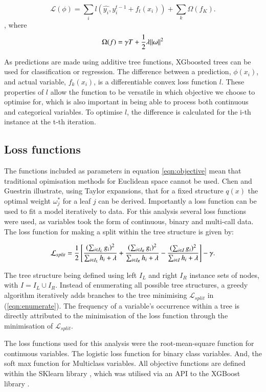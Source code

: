 \documentclass[review,12pt,authoryear]{elsarticle}
\begin{document}
\begin{linenumbers}
\begin{equation}\label{eqn:objective}
 \mathcal{L}(\phi)=\sum_i l(\hat{y_i}, y_i^{t-1} + f_t(x_i)) + \sum_k \Omega (f_K).
\end{equation}, where
\begin{equation}
  \Omega(f) = \gamma T + {{1}\over{2}}\lambda ||\omega||^2
\end{equation}

As predictions are made using additive tree functions, XGboosted trees can be used for classification or regression. The difference between a prediction, $\phi(x_i)$, and actual variable, $f_{k}(x_i)$, is a differentiable convex loss function $l$. These properties of $l$ allow the function to be versatile in which objective we choose to optimise for, which is also important in being able to process both continuous and categorical variables. To optimise $l$, the difference is calculated for the i-th instance at the t-th iteration.
\subsection{Loss functions}

The functions included as parameters in equation \ref{eqn:objective} mean that traditional opimisation methods for Euclidean space cannot be used. Chen and Guestrin \citep{chenXGBoostScalableTree2016} illustrate, using Taylor expansions, that for a fixed structure $q(x)$ the optimal weight $\omega^*_j$ for a leaf $j$ can be derived. Importantly a loss function can be used to fit a model iteratively to data. For this analysis several loss functions were used, as variables took the form of continuous, binary and multi-call data. The loss function for making a split within the tree structure is given by:

\begin{equation} \label{eqn:enumerate}
\mathcal{L}_{split} = {{1}\over{2}} \left[ 
 {{(\sum_{i\in I_L}g_i)^{2}}\over{\sum_{i\in I_L} h_i + \lambda}} +
 {{(\sum_{i\in I_R}g_i)^{2}}\over{\sum_{i\in I_R} h_i + \lambda}} -
 {{(\sum_{i\in I}{g_i})^{2}}\over{\sum_{i \in I} h_i + \lambda}} \right] - \gamma.
\end{equation}

The tree structure being defined using left $I_L$ and right $I_R$ instance sets of nodes, with $I = I_L \cup I_R$. Instead of enumerating all possible tree structures, a greedy algorithm iteratively adds branches to the tree minimising $ \mathcal{L}_{split} $ in (\ref{eqn:enumerate}). The frequency of a variable's occurrence within a tree is directly attributed to the minimisation of the loss function through the minimisation of $ \mathcal{L}_{split} $.
\par
The loss functions used for this analysis were the root-mean-square function for continuous variables. The logistic loss function for binary class variables. And, the soft max function for Multiclass variables. All objective functions are defined within the SKlearn library \citep{sklearn_api}, which was utilised via an API to the XGBoost library \citep{chenXGBoostScalableTree2016}.
\par

\end{linenumbers}
\end{document}
